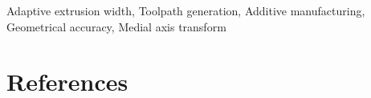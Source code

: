 \documentclass[5p,twocolumn,10pt,times]{elsarticle}
\theoremstyle{definition}
\begin{document}
\begin{frontmatter}
%
%


\begin{keyword} 
Adaptive extrusion width, Toolpath generation, Additive manufacturing, Geometrical accuracy, Medial axis transform
\end{keyword}

\end{frontmatter}



















\section*{References}



\begin{appendices}





\end{appendices}
\end{document}
